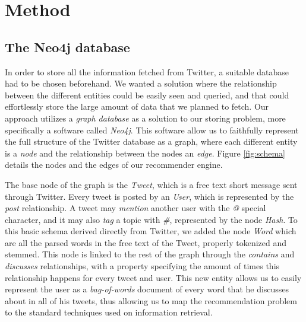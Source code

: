 \section{Method}
\label{sec:method}



\subsection{The Neo4j database}

In order to store all the information fetched from Twitter, a suitable database had to be chosen beforehand. We wanted a solution where the relationship between the different entities could be easily seen and queried, and that could effortlessly store the large amount of data that we planned to fetch. Our approach utilizes a \emph{graph database} as a solution to our storing problem, more specifically a software called \emph{Neo4j}\cite{neo4j}. This software allow us to faithfully represent the full structure of the Twitter database as a graph, where each different entity is a \emph{node} and the relationship between the nodes an \emph{edge}. Figure \ref{fig:schema} details the nodes and the edges of our recommender engine.

The base node of the graph is the \emph{Tweet}, which is a free text short message sent through Twitter. Every tweet is posted by an \emph{User}, which is represented by the \emph{post} relationship. A tweet may \emph{mention} another user with the \emph{@} special character, and it may also \emph{tag} a topic with \emph{\#}, represented by the node \emph{Hash}. To this basic schema derived directly from Twitter, we added the node \emph{Word} which are all the parsed words in the free text of the Tweet, properly tokenized and stemmed. This node is linked to the rest of the graph through the \emph{contains} and \emph{discusses} relationships, with a property specifying the amount of times this relationship happens for every tweet and user. This new entity allows us to easily represent the user as a \emph{bag-of-words} document of every word that he discusses about in all of his tweets, thus allowing us to map the recommendation problem to the standard techniques used on information retrieval. 


